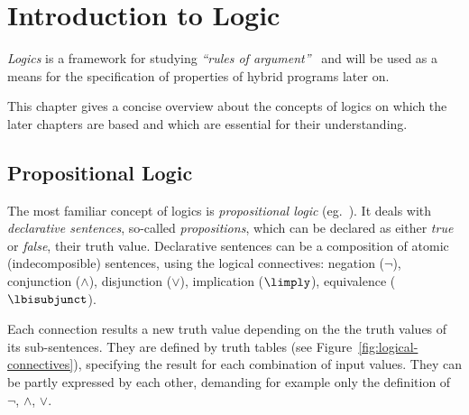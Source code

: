 \chapter{Introduction to Logic}
    \label{sec:introduction-logic}

    \emph{Logics} is a framework for studying \emph{``rules of argument''}~\cite{Hodges01ClassicalLogic} and will be used as a means for the specification of properties of hybrid programs later on.

    This chapter gives a concise overview about the concepts of logics on which the later chapters are based and which are essential for their understanding.


    \section{Propositional Logic}
        \label{sec:propositional-logic}


        The most familiar concept of logics is \emph{propositional logic} (eg.~\cite{Huth04LogicInCS}). It deals with \emph{declarative sentences}, so-called \emph{propositions}, which can be declared as either \emph{true} %
        or \emph{false}, %
        their truth value.
        Declarative sentences can be a composition of atomic (indecomposible) sentences, using the logical connectives: negation ($\lnot$), conjunction ($\land$), disjunction ($\lor$), implication ($\limply$), equivalence ($\lbisubjunct$).

        Each connection results a new truth value depending on the the truth values of its sub-sentences. They are defined by truth tables (see Figure~\ref{fig:logical-connectives}), specifying the result for each combination of input values. They can be partly expressed by each other, demanding for example only the definition of $\lnot$, $\land$, $\lor$.

